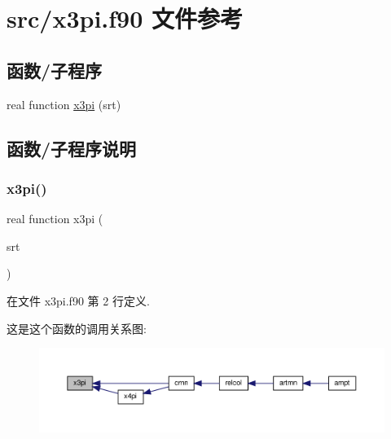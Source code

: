 \hypertarget{x3pi_8f90}{}\section{src/x3pi.f90 文件参考}
\label{x3pi_8f90}
\subsection*{函数/子程序}
\begin{DoxyCompactItemize}
\item 
real function \mbox{\hyperlink{x3pi_8f90_a562b20d8442a8af624be2181f0db3dce}{x3pi}} (srt)
\end{DoxyCompactItemize}


\subsection{函数/子程序说明}
\mbox{\label{x3pi_8f90_a562b20d8442a8af624be2181f0db3dce}} 
\subsubsection{\texorpdfstring{x3pi()}{x3pi()}}
{\footnotesize\ttfamily real function x3pi (\begin{DoxyParamCaption}\item[{}]{srt }\end{DoxyParamCaption})}



在文件 x3pi.\+f90 第 2 行定义.

这是这个函数的调用关系图\+:
\nopagebreak
\begin{figure}[H]
\begin{center}
\leavevmode
\includegraphics[width=350pt]{x3pi_8f90_a562b20d8442a8af624be2181f0db3dce_icgraph}
\end{center}
\end{figure}

